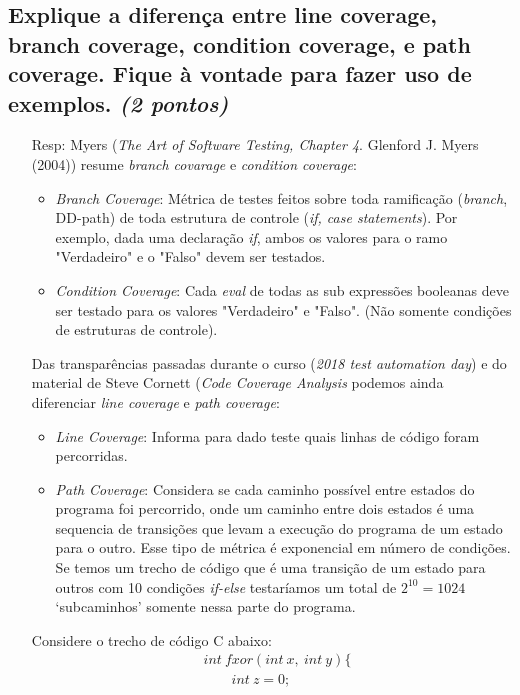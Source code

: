 \documentclass[paper=a4, fontsize=11pt]{scrartcl} %
\numberwithin{equation}{section} %
\numberwithin{figure}{section} %
\numberwithin{table}{section} %
\begin{document}
\subsection{Explique a diferença entre line coverage, branch coverage, condition coverage, e path coverage. Fique à vontade para fazer uso de exemplos. \textit{(2 pontos)}}
    \begin{itemize}
        \item[Resp:] Myers (\textit{The Art of Software Testing, Chapter 4}. Glenford J. Myers (2004)) resume \textit{branch covarage} e \textit{condition coverage}:
        \begin{itemize}
            \item \textit{Branch Coverage}: Métrica de testes feitos sobre toda ramificação (\textit{branch}, DD-path) de toda estrutura de controle (\textit{if, case statements}). Por exemplo, dada uma declaração \textit{if}, ambos os valores para o ramo "Verdadeiro" e o "Falso" devem ser testados.
            \item \textit{Condition Coverage}: Cada \textit{eval} de todas as sub expressões booleanas deve ser testado para os valores "Verdadeiro" e "Falso". (Não somente condições de estruturas de controle).
        \end{itemize}
         Das transparências passadas durante o curso (\textit{2018 test automation day}) e do material de Steve Cornett (\textit{Code Coverage Analysis} podemos ainda diferenciar \textit{line coverage} e \textit{path coverage}:
         \begin{itemize}
             \item \textit{Line Coverage}: Informa para dado teste quais linhas de código foram percorridas.
             \item \textit{Path Coverage}: Considera se cada caminho possível entre estados do programa foi percorrido, onde um caminho entre dois estados é uma sequencia de transições que levam a execução do programa de um estado para o outro. Esse tipo de métrica é exponencial em número de condições. Se temos um trecho de código que é uma transição de um estado para outros com 10 condições \textit{if-else} testaríamos um total de $2^{10} = 1024$ `subcaminhos' somente nessa parte do programa.
         \end{itemize}
         Considere o trecho de código C abaixo:
         \begin{align*}
             & int\ fxor(int\ x,\ int\ y)\{\\
             & \qquad int\ z=0;\\

\end{align*}
\end{itemize}
\end{document}
